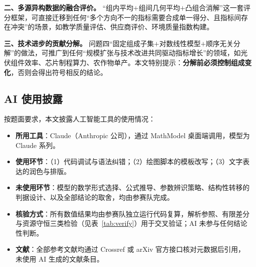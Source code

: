\textbf{二、多源异构数据的融合评价。} ``组内平均$+$组间几何平均$+$凸组合消解''这一套评分框架，可直接迁移到任何``多个方向不一的指标需要合成单一得分、且指标间存在冲突''的场景，如教学质量评估、供应商评价、环境质量指数构建。

\textbf{三、技术进步的贡献分解。} 问题四``固定组成子集$+$对数线性模型$+$顺序无关分解''的做法，可推广到任何``规模扩张与技术改进共同驱动指标增长''的领域，如光伏组件效率、芯片制程算力、农作物单产。本文特别提示：\textbf{分解前必须控制组成变化}，否则会得出符号相反的结论。

\subsection{AI 使用披露}

按题面要求，本文披露人工智能工具的使用情况：

\begin{itemize}[leftmargin=2em,itemsep=2pt]
\item \textbf{所用工具}：Claude（Anthropic 公司），通过 MathModel 桌面端调用，模型为 Claude 系列。
\item \textbf{使用环节}：（1）代码调试与语法纠错；（2）绘图脚本的模板改写；（3）文字表达的润色与排版。
\item \textbf{未使用环节}：模型的数学形式选择、公式推导、参数辨识策略、结构性转移的判据设计、以及全部结论的取舍，均由参赛队完成。
\item \textbf{核验方式}：所有数值结果均由参赛队独立运行代码复算，解析参照、有限差分与资源守恒三类检验（见表~\ref{tab:verify}）用于交叉验证；AI 未参与任何结论性判断。
\item \textbf{文献}：全部参考文献均通过 Crossref 或 arXiv 官方接口核对元数据后引用，未使用 AI 生成的文献条目。
\end{itemize}
